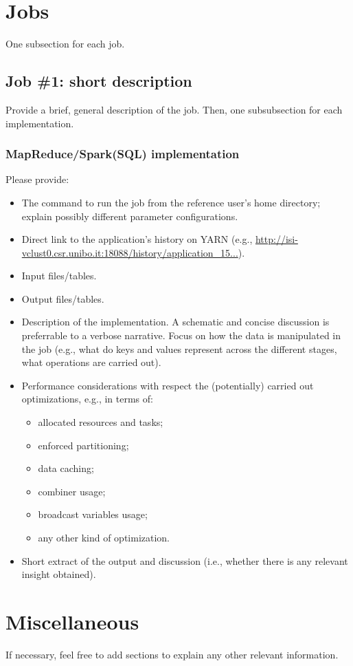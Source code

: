 \documentclass[10pt]{article}
\begin{document}
    \section{Jobs}

    One subsection for each job.

    \subsection{Job \#1: short description}

    Provide a brief, general description of the job. Then, one subsubsection for each implementation.

    \subsubsection{MapReduce/Spark(SQL) implementation}

    Please provide:
    \begin{itemize}
        \item The command to run the job from the reference user's home directory; explain possibly different parameter configurations.
        \item Direct link to the application's history on YARN (e.g., \url{http://isi-vclust0.csr.unibo.it:18088/history/application_15...}).
        \item Input files/tables.
        \item Output files/tables.
        \item Description of the implementation. A schematic and concise discussion is preferrable to a verbose narrative. Focus on how the data is manipulated in the job (e.g., what do keys and values represent across the different stages, what operations are carried out).
        \item Performance considerations with respect the (potentially) carried out optimizations, e.g., in terms of:
        \begin{itemize}
            \item allocated resources and tasks;
            \item enforced partitioning;
            \item data caching;
            \item combiner usage;
            \item broadcast variables usage;
            \item any other kind of optimization.
        \end{itemize}
        \item Short extract of the output and discussion (i.e., whether there is any relevant insight obtained).
    \end{itemize}

    \section{Miscellaneous}

    If necessary, feel free to add sections to explain any other relevant information.
\end{document}
